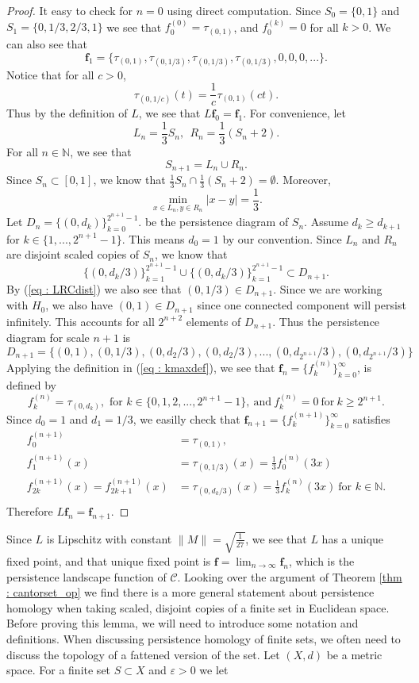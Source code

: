 \documentclass [52pt] {article}
\newcommand{\N}{\mathbb{N}}
\begin{document}
\begin{proof}
It easy to check for $n = 0$ using direct computation.  Since $S_0 = \{0,1\}$ and $S_1 = \{0,1/3,2/3,1\}$ we see that $f_0^{(0)} = \tau_{(0,1)}$, and $f_0^{(k)} = 0$ for all $k> 0$.  We can also see that 
\[\mathbf{f}_1 = \{\tau_{(0,1)}, \tau_{(0,1/3)}, \tau_{(0,1/3)}, \tau_{(0,1/3)},0,0,0,...\}.\]
Notice that for all $c>0$, 
\[\tau_{(0,1/c)}(t) = \frac{1}{c}\tau_{(0,1)}(ct).\]
Thus by the definition of $L$, we see that $L\mathbf{f}_0 = \mathbf{f}_1$.   For convenience, let 
\[L_n = \frac{1}{3}S_n,\:\:R_n = \frac{1}{3}(S_n +2).\]
For all $n\in\N$, we see that
\[S_{n+1} = L_n\cup R_n.\]
Since $S_n\subset[0,1]$, we know that $\frac{1}{3}S_n\cap \frac{1}{3}(S_n+2) = \emptyset$.  Moreover,
\begin{equation}\label{eq : LRCdist}
\min_{x\in L_n,y\in R_n} |x-y| = \frac{1}{3}.
\end{equation}
Let $D_n = \{(0,d_k)\}_{k=0}^{2^{n+1}-1}$. be the persistence diagram of $S_n$.  Assume $d_k\ge d_{k+1}$ for $k\in\{1,...,2^{n+1}-1\}$.  This means $d_0 = 1$ by our convention.  Since $L_n$ and $R_n$ are disjoint scaled copies of $S_n$, we know that 
\[\{(0,d_k/3)\}_{k =1}^{2^{n+1}-1}\cup\{(0,d_k/3)\}_{k =1}^{2^{n+1}-1}\subset D_{n+1}.\]
By (\ref{eq : LRCdist}) we also see that $(0,1/3)\in D_{n+1}$.  Since we are working with $H_0$, we also have $(0,1)\in D_{n+1}$ since one connected component will persist infinitely.  This accounts for all $2^{n+2}$ elements of $D_{n+1}$.  Thus the persistence diagram for scale $n+1$ is 
\[D_{n+1} = \{(0,1), (0,1/3), (0,d_2/3), (0,d_2/3), ...,(0,d_{2^{n+1}}/3), (0,d_{2^{n+1}}/3)\}\]
Applying the definition in (\ref{eq : kmaxdef}), we see that $\mathbf{f}_n = \{f_k^{(n)}\}_{k=0}^\infty$, is defined by
\[f_k^{(n)} = \tau_{(0,d_k)}, \text{ for } k\in\{0,1,2,...,2^{n+1}-1\}, \:\text{and}\:f_k^{(n)}=0\: \text{for}\: k\ge 2^{n+1}.\]
Since $d_0 = 1$ and $d_1 = 1/3$, we easilly check that $\mathbf{f}_{n+1} = \{f_k^{(n+1)}\}_{k=0}^\infty$ satisfies 
\[\begin{split}
f_0^{(n+1)} &= \tau_{(0,1)},\\
f_1^{(n+1)}(x) &= \tau_{(0,1/3)}(x) = \frac{1}{3}f_0^{(n)}(3x)\\
f_{2k}^{(n+1)}(x) = f_{2k+1}^{(n+1)}(x) &= \tau_{(0,d_k/3)}(x) = \frac{1}{3}f_k^{(n)}(3x)\:\text{for } k\in\N .\\ 
\end{split}\]
Therefore $L\mathbf{f}_n = \mathbf{f}_{n+1}$.

\end{proof}
Since $L$ is Lipschitz with constant $\|M\| = \sqrt{\frac{1}{27}}$, we see that $L$ has a unique fixed point, and that unique fixed point is $\mathbf{f} = \lim_{n\to\infty}\mathbf{f}_n$, which is the persistence landscape function of $\mathcal{C}$.  Looking over the argument of Theorem \ref{thm :  cantorset_op} we find there is a more general statement about persistence homology when taking scaled, disjoint copies of a finite set in Euclidean space.  Before proving this lemma, we will need to introduce some notation and definitions.  When discussing persistence homology of finite sets, we often need to discuss the topology of a fattened version of the set.  Let $(X,d)$ be a metric space.  For a finite set $S\subset X$ and $\varepsilon>0$ we let
\end{document}
